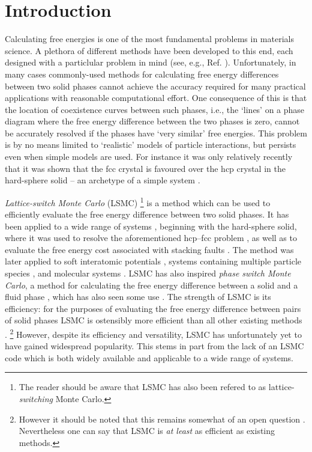 \documentclass{report}
\begin{document}
\chapter{Introduction}
Calculating free energies is one of the most fundamental problems in materials science.
A plethora of different methods have been developed to this end, each designed with a particlular problem in mind (see, e.g., Ref. \cite{book:Frenkel}).
Unfortunately, in many cases commonly-used methods for calculating free energy differences between two solid phases cannot
achieve the accuracy required for many practical applications with reasonable computational effort.
One consequence of this is that the location of coexistence curves between such phases, i.e., the `lines' on a phase diagram
where the free energy difference between the two phases is zero, cannot be accurately resolved if the phases
have `very similar' free energies. This problem is by no means limited to `realistic' models of particle interactions, but
persists even when simple models are used. For instance it was only relatively recently that it was shown that the fcc crystal is
favoured over the hcp crystal in the hard-sphere solid -- an archetype of a simple system \cite{Bruce_1997,Bruce_2000,Jackson_2002}.

\emph{Lattice-switch Monte Carlo} (LSMC) \cite{Bruce_1997,Bruce_2000}
\footnote{The reader should be aware that LSMC has also been refered to as lattice-\emph{switching} Monte Carlo.}
is a method which can be used to efficiently evaluate the free energy difference between two solid phases.
It has been applied to a wide range of systems \cite{Bruce_1997,Pronk_1999,Mau_1999,Bruce_2000,Jackson_2002,Jackson_2007,Yang_2008,
Marechal_2008,Raiteri_2010,Wilms_2012,Quigley_2014,Bridgwater_2014,Underwood_2015},
beginning with the hard-sphere solid, where it was used to resolve the aforementioned hcp--fcc problem \cite{Bruce_1997,Bruce_2000},
as well as to evaluate the free energy cost associated with stacking faults \cite{Pronk_1999,Mau_1999}.
The method was later applied to soft interatomic potentials \cite{Jackson_2002,Wilms_2012,Underwood_2015},
systems containing multiple particle species \cite{Jackson_2007,Yang_2008}, and molecular systems
\cite{Marechal_2008,Raiteri_2010,Quigley_2014,Bridgwater_2014}.
LSMC has also inspired \emph{phase switch Monte Carlo}, a method for calculating the free energy difference between a solid and a
fluid phase \cite{Wilding_2000}, which has also seen some use
\cite{Wilding_2000,Errington_2004,McNeil-Watson_2006,Wilding_2009_MP,Wilding_2009_JCP,Sollich_2010,Wilding_2010}.
%                              
The strength of LSMC is its efficiency: for the purposes of evaluating the free energy difference between pairs of solid phases LSMC is ostensibly
more efficient than all other existing methods \cite{Wilms_2012,Marechal_2008}.
\footnote{However it should be noted that this remains somewhat of an open question \cite{Pronk_1999,Sweatman_2015}. Nevertheless one can say that LSMC is
\emph{at least} as efficient as existing methods.}
However, despite its efficiency and versatility, LSMC has unfortunately yet to have gained widespread popularity. This stems in part from the lack of
an LSMC code which is both widely available and applicable to a wide range of systems.
\end{document}
